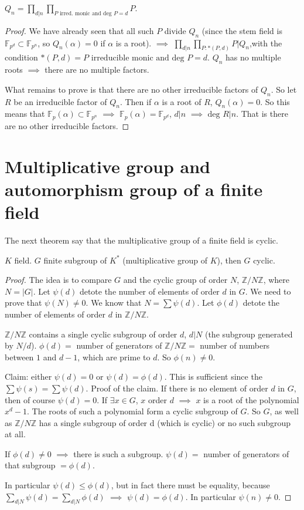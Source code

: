 \begin{corollary} 
$Q_n=\prod_{d|n}\prod_{P \text{ irred. monic and deg }P=d}P$.\end{corollary} 
\begin{proof}
We have already seen that all such $P$ divide $Q_n$ (since the stem field is $\mathbb{F}_{p^d}\subset \mathbb{F}_{p^n}$, so $Q_n(\alpha)=0$ if $\alpha$ is a root). $\implies$ $\prod_{d|n}\prod_{P:*(P,d)}P|Q_n$,with the condition $*(P,d)=P\text{ irreducible monic and deg }P=d$. $Q_n$ has no multiple roots $\implies$ there are no multiple factors. 

What remains to prove is that there are no other irreducible factors of $Q_n$. So let $R$ be an irreducible factor of $Q_n$. Then if $\alpha$ is a root of $R$, $Q_n(\alpha)=0$. So this means that $\mathbb{F}_p(\alpha)\subset \mathbb{F}_{p^n}$ $\implies$ $\mathbb{F}_p(\alpha) = \mathbb{F}_{p^d}$, $d|n$ $\implies$ $\text{deg }R|n$. That is there are no other irreducible factors.
\end{proof}

\section{Multiplicative group and automorphism group of a finite field}

The next theorem say that the multiplicative group of a finite field is cyclic.  

\begin{theorem}
$K$ field. $G$ finite subgroup of $K^*$ (multiplicative group of $K$), then $G$ cyclic.
\end{theorem}
\begin{proof}
The idea is to compare $G$ and the cyclic group of order $N$, $\mathbb{Z}/N\mathbb{Z}$, where $N=|G|$. Let $\psi(d)$ detote the number of elements of order $d$ in $G$. We need to prove that $\psi(N)\neq 0$. We know that $N=\sum \psi(d)$. Let $\phi(d)$ detote the number of elements of order $d$ in $\mathbb{Z}/N\mathbb{Z}$. 

$\mathbb{Z}/N\mathbb{Z}$ contains a single cyclic subgroup of order $d$, $d|N$ (the subgroup generated by $N/d$). $\phi(d)=$  number of generators of $\mathbb{Z}/N\mathbb{Z}=$ number of numbers between $1$ and $d - 1$, which are prime to $d$. So $\phi(n)\neq 0$. 

Claim: either $\psi(d)=0$ or $\psi(d)=\phi(d)$. This is sufficient since the $\sum \psi(s)=\sum\psi(d)$. Proof of the claim. If there is no element of order $d$ in $G$, then of course $\psi(d) =0$. If $\exists x\in G$, $x$ order $d$ $\implies$ $x$ is a root of the polynomial $x^d -1$. The roots of such a polynomial form a cyclic subgroup of $G$. So $G$, as well as $\mathbb{Z}/N\mathbb{Z}$ has a single subgroup of order d (which is cyclic) or no such subgroup at all. 

If $\phi(d)\neq 0$ $\implies$ there is such a subgroup. $\psi(d)=$ number of generators of that subgroup $=\phi(d)$. 

In particular $\psi(d)\leq \phi(d)$, but in fact there must be equality, because $\sum_{d|N}\psi(d)=\sum_{d|N}\phi(d)$ $\implies$ $\psi(d)=\phi(d)$.  In particular $\psi(n)\neq 0$. 
\end{proof}

